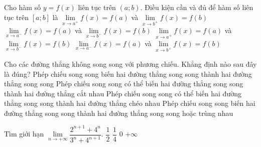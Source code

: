 \begin{ex}%
	Cho hàm số $y=f\left(x\right)$ liên tục trên $(a;b)$. Điều kiện cần và đủ để hàm số liên tục trên $\left[a; b\right]$ là
	\choice
	{${\mathop{\lim}\limits_{x\to a^{+}}} f\left(x\right)=f\left(a\right)$ và ${\mathop{\lim}\limits_{x\to b^{+}}} f\left(x\right)=f\left(b\right)$}
	{${\mathop{\lim}\limits_{x\to a^{-}}} f\left(x\right)=f\left(a\right)$ và ${\mathop{\lim}\limits_{x\to b^{-}}} f\left(x\right)=f\left(b\right)$}
	{\True ${\mathop{\lim}\limits_{x\to a^{+}}} f\left(x\right)=f\left(a\right)$ và ${\mathop{\lim}\limits_{x\to b^{-}}} f\left(x\right)=f\left(b\right)$}
	{${\mathop{\lim}\limits_{x\to a^{-}}} f\left(x\right)=f\left(a\right)$ và ${\mathop{\lim}\limits_{x\to b^{+}}} f\left(x\right)=f\left(b\right)$}
\end{ex}

\begin{ex}%
	Cho các đường thẳng không song song với phương chiếu. Khẳng định nào sau đây là đúng?
	\choice
	{Phép chiếu song song biến hai đường thẳng song song thành hai đường thẳng song song}
	{Phép chiếu song song có thể biến hai đường thẳng song song thành hai đường thẳng cắt nhau}
	{Phép chiếu song song có thể biến hai đường thẳng song song thành hai đường thẳng chéo nhau}
	{\True Phép chiếu song song biến hai đường thẳng song song thành hai đường thẳng song song hoặc trùng nhau}
\end{ex}

\begin{ex}%
	Tìm giới hạn $\lim \limits_{n \to +\infty}\dfrac{2^{n+1}+4^n}{3^n+4^{n+1}}$.
	\choice
	{$\dfrac{1}{2}$}
	{\True $\dfrac{1}{4}$}
	{$0$}
	{$+\infty$}
\end{ex}

